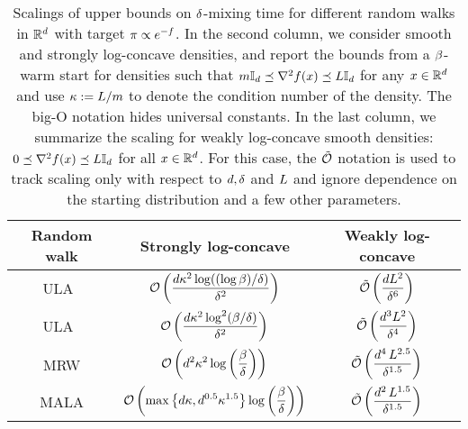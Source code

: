 \documentclass[final, 12pt]{colt2018} %
\begin{document}
\begin{table}
    \centering
    {\renewcommand{\arraystretch}{1.8}
    \begin{tabular}{ccc}
        \toprule
        \small {\bf Random walk} & {\bf Strongly log-concave}
        & {\bf Weakly log-concave}
        \\ \midrule
        ULA~\citep{cheng2017convergence}
        &$\mathcal{O}\left( \displaystyle\frac{d\kappa^2\log((\log \beta)/\delta)}{\delta^2} \right)$
        & $\displaystyle\tilde{\mathcal{O}}\left( \frac{dL^{2}}{\delta^{6}} \right)$
        \\[2mm]
        ULA~\citep{dalalyan2016theoretical}
        &$\mathcal{O}\left( \displaystyle\frac{d\kappa^2 \log^2(\beta/\delta)}{\delta^2} \right)$
        & $\displaystyle\tilde{\mathcal{O}}\left( \frac{d^3L^{2}}{\delta^{4}} \right)$
        \\[2mm]
        MRW
        &$\mathcal{O}\left( \displaystyle d^2 \kappa^2 \log\left( \frac{\beta}{\delta} \right) \right)$
        & $\displaystyle\tilde{\mathcal{O}}\left( \frac{d^4\,L^{2.5}}{\delta^{1.5}} \right)$
        \\[2mm]
%
        MALA
        &$\mathcal{O}\left( \displaystyle \max\left\{ d\kappa, d^{0.5}\kappa^{1.5} \right \}
                \log\left( \frac{\beta}{\delta} \right) \right)$
        & $\displaystyle\tilde{\mathcal{O}}\left( \frac{d^2\, L^{1.5}}{\delta^{1.5}} \right)$
        \\[2ex]
        \bottomrule
        \hline
    \end{tabular}
    }
    \caption{Scalings of upper bounds on $\delta$-mixing time for different random walks in
      $\mathbb{R}^{d}$ with target $\pi \propto e^{-f}$.
      In the second column, we consider smooth and strongly log-concave densities, and report the bounds from a $\beta$-warm start for densities such that
      $m \mathbb{I}_{d} \preceq \nabla^2 f(x) \preceq
      L\mathbb{I}_{d}$ for any $x \in \mathbb{R}^{d}$ and use $\kappa
      := L/m$ to denote the condition number of the density. The big-O notation hides universal constants.
      In the last column, we summarize the scaling for weakly log-concave smooth densities: $0 \preceq \nabla^2 f(x) \preceq
      L\mathbb{I}_{d}$ for all $x \in \mathbb{R}^{d}$. For this case, the $\tilde{\mathcal{O}}$ notation is used to track scaling only with respect to $d, \delta$ and $L$ and ignore dependence on the starting distribution and a few other parameters.}
    \label{tab:mixing_times}
\end{table}
\end{document}
